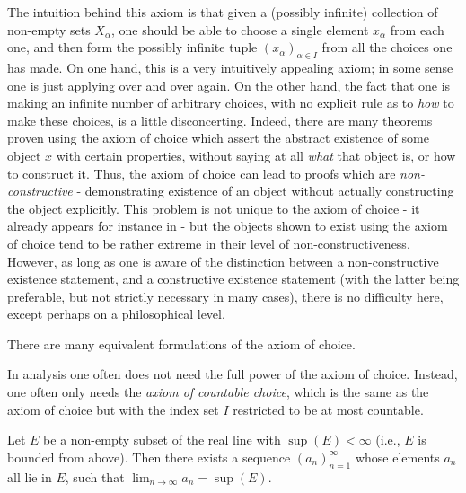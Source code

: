 \begin{rmk}\label{i:8.4.3}
  The intuition behind this axiom is that given a (possibly infinite) collection of non-empty sets \(X_{\alpha}\), one should be able to choose a single element \(x_{\alpha}\) from each one, and then form the possibly infinite tuple \((x_{\alpha})_{\alpha \in I}\) from all the choices one has made.
  On one hand, this is a very intuitively appealing axiom;
  in some sense one is just applying  over and over again.
  On the other hand, the fact that one is making an infinite number of arbitrary choices, with no explicit rule as to \emph{how} to make these choices, is a little disconcerting.
  Indeed, there are many theorems proven using the axiom of choice which assert the abstract existence of some object \(x\) with certain properties, without saying at all \emph{what} that object is, or how to construct it.
  Thus, the axiom of choice can lead to proofs which are \emph{non-constructive} - demonstrating existence of an object without actually constructing the object explicitly.
  This problem is not unique to the axiom of choice - it already appears for instance in  - but the objects shown to exist using the axiom of choice tend to be rather extreme in their level of non-constructiveness.
  However, as long as one is aware of the distinction between a non-constructive existence statement, and a constructive existence statement (with the latter being preferable, but not strictly necessary in many cases), there is no difficulty here, except perhaps on a philosophical level.
\end{rmk}

\begin{rmk}\label{i:8.4.4}
  There are many equivalent formulations of the axiom of choice.
\end{rmk}

\begin{note}
  In analysis one often does not need the full power of the axiom of choice.
  Instead, one often only needs the \emph{axiom of countable choice}, which is the same as the axiom of choice but with the index set \(I\) restricted to be at most countable.
\end{note}

\begin{lem}\label{i:8.4.5}
  Let \(E\) be a non-empty subset of the real line with \(\sup(E) < \infty\)
  (i.e., \(E\) is bounded from above).
  Then there exists a sequence \((a_n)_{n = 1}^\infty\) whose elements \(a_n\) all lie in \(E\), such that \(\lim_{n \to \infty} a_n = \sup(E)\).
\end{lem}

